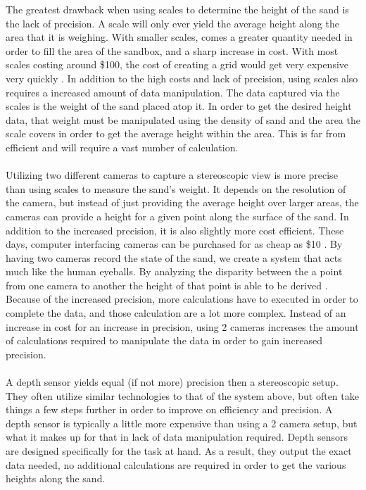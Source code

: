 The greatest drawback when using scales to determine the height of the sand is the lack of precision.
A scale will only ever yield the average height along the area that it is weighing.
With smaller scales, comes a greater quantity needed in order to fill the area of the sandbox, and a sharp increase in cost.
With most scales costing around \$100, the cost of creating a grid would get very expensive very quickly .
In addition to the high costs and lack of precision, using scales also requires a increased amount of data manipulation.
The data captured via the scales is the weight of the sand placed atop it.
In order to get the desired height data, that weight must be manipulated using the density of sand and the area the scale covers in order to get the average height within the area.
This is far from efficient and will require a vast number of calculation.
\\\\
Utilizing two different cameras to capture a stereoscopic view is more precise than using scales to measure the sand's weight.  
It depends on the resolution of the camera, but instead of just providing the average height over larger areas, the cameras can provide a height for a given point along the surface of the sand.
In addition to the increased precision, it is also slightly more cost efficient.
These days, computer interfacing cameras can be purchased for as cheap as \$10 .
By having two cameras record the state of the sand, we create a system that acts much like the human eyeballs. 
By analyzing the disparity between the a point from one camera to another the height of that point is able to be derived .
Because of the increased precision, more calculations have to executed in order to complete the data, and those calculation are a lot more complex. 
Instead of an increase in cost for an increase in precision, using 2 cameras increases the amount of calculations required to manipulate the data in order to gain increased precision.
\\\\
A depth sensor yields equal (if not more) precision then a stereoscopic setup.
They often utilize similar technologies to that of the system above, but often take things a few steps further in order to improve on efficiency and precision.
A depth sensor is typically a little more expensive than using a 2 camera setup, but what it makes up for that in lack of data manipulation required.
Depth sensors are designed specifically for the task at hand.  As a result, they output the exact data needed, no additional calculations are required in order to get the various heights along the sand.

